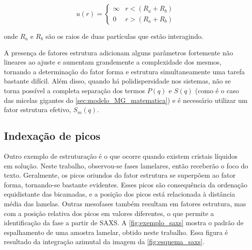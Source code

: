 		\begin{equation}
			u(r) = 
			\begin{cases}
				\infty  & r < (R_a + R_b) \\
				0		& r > (R_a + R_b)
			\end{cases}
			\label{eqn:potencial_esfera_rígida}
		\end{equation}

		\noindent onde \(R_a\) e \(R_b\) são os raios de duas partículas que estão interagindo.
		
		A presença de fatores estrutura adicionam alguns parâmetros fortemente não lineares ao ajuste e aumentam grandemente a complexidade dos mesmos, tornando a determinação do fator forma e estrutura simultaneamente uma tarefa bastante difícil. Além disso, quando há polidispersidade nos sistemas, não se torna possível a completa separação dos termos \(P(q)\) e \(S(q)\) (como é o caso das micelas gigantes do \autoref{sec:modelo_MG_matematica}) e é necessário utilizar um fator estrutura efetivo, \(S_m(q)\).\cite{Narayanan2008a}
		
		\subsection{Indexação de picos} 
		\label{sec:teoria_SAXS}
		
		Outro exemplo de estruturação é o que ocorre quando existem cristais líquidos em solução. Neste trabalho, observou-se fases lamelares, então receberão o foco do texto. Geralmente, os picos oriundos do fator estrutura se superpõem ao fator forma, tornando-se bastante evidentes. Esses picos são consequência da ordenação equidistante das bicamadas, e a posição dos picos está relacionada à distância média das lamelas.\cite{Glatter2018livro} Outras mesofases também resultam em fatores estrutura, mas com a posição relativa dos picos em valores diferentes, o que permite a identificação da fase a partir de SAXS.\cite{Narayanan2008a} A \autoref{fig:exemplo_saxs} mostra o padrão de espalhamento de uma amostra lamelar, obtido neste trabalho. Essa figura é resultado da integração azimutal da imagem da \autoref{fig:esquema_saxs}.
		
